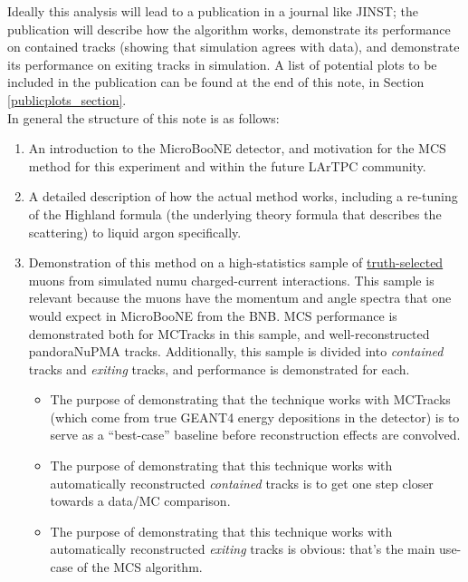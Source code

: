 \documentclass{article}
\begin{document}
Ideally this analysis will lead to a publication in a journal like JINST; the publication will describe how the algorithm works, demonstrate its performance on contained tracks (showing that simulation agrees with data), and demonstrate its performance on exiting tracks in simulation. A list of potential plots to be included in the publication can be found at the end of this note, in Section \ref{publicplots_section}.\\

In general the structure of this note is as follows:
\begin{enumerate}
\item An introduction to the MicroBooNE detector, and motivation for the MCS method for this experiment and within the future LArTPC community.
\item A detailed description of how the actual method works, including a re-tuning of the Highland formula (the underlying theory formula that describes the scattering) to liquid argon specifically.
\item Demonstration of this method on a high-statistics sample of \underline{truth-selected} muons from simulated numu charged-current interactions. This sample is relevant because the muons have the momentum and angle spectra that one would expect in MicroBooNE from the BNB. MCS performance is demonstrated both for {\sc MCTracks} in this sample, and well-reconstructed pandoraNuPMA tracks. Additionally, this sample is divided into \textit{contained} tracks and \textit{exiting} tracks, and performance is demonstrated for each.
\begin{itemize}
	\item The purpose of demonstrating that the technique works with {\sc MCTracks} (which come from true {\sc GEANT4} energy depositions in the detector) is to serve as a ``best-case'' baseline before reconstruction effects are convolved. 
	\item The purpose of demonstrating that this technique works with automatically reconstructed \textit{contained} tracks is to get one step closer towards a data/MC comparison.
	\item The purpose of demonstrating that this technique works with automatically reconstructed \textit{exiting} tracks is obvious: that's the main use-case of the MCS algorithm.
\end{itemize}

\end{enumerate}
\end{document}
